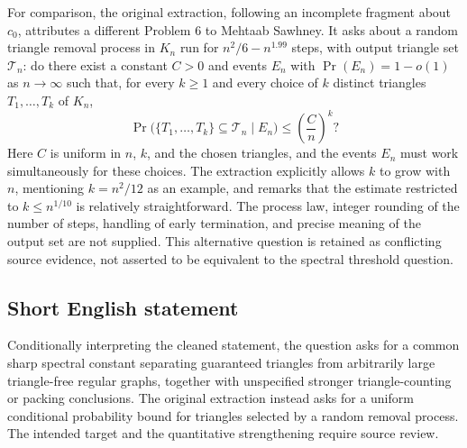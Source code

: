 \documentclass[11pt]{article}
\begin{document}
For comparison, the original extraction, following an incomplete fragment about $c_0$, attributes a different Problem 6 to Mehtaab Sawhney. It asks about a random triangle removal process in $K_n$ run for $n^2/6-n^{1.99}$ steps, with output triangle set $\mathcal T_n$: do there exist a constant $C>0$ and events $E_n$ with $\Pr(E_n)=1-o(1)$ as $n\to\infty$ such that, for every $k\geq 1$ and every choice of $k$ distinct triangles $T_1,\ldots,T_k$ of $K_n$,
\[
\Pr\bigl(\{T_1,\ldots,T_k\}\subseteq\mathcal T_n\mid E_n\bigr)
\leq \left(\frac{C}{n}\right)^k?
\]
Here $C$ is uniform in $n$, $k$, and the chosen triangles, and the events $E_n$ must work simultaneously for these choices. The extraction explicitly allows $k$ to grow with $n$, mentioning $k=n^2/12$ as an example, and remarks that the estimate restricted to $k\leq n^{1/10}$ is relatively straightforward. The process law, integer rounding of the number of steps, handling of early termination, and precise meaning of the output set are not supplied. This alternative question is retained as conflicting source evidence, not asserted to be equivalent to the spectral threshold question.
\subsection{Short English statement}
Conditionally interpreting the cleaned statement, the question asks for a common sharp spectral constant separating guaranteed triangles from arbitrarily large triangle-free regular graphs, together with unspecified stronger triangle-counting or packing conclusions. The original extraction instead asks for a uniform conditional probability bound for triangles selected by a random removal process. The intended target and the quantitative strengthening require source review.
\end{document}
